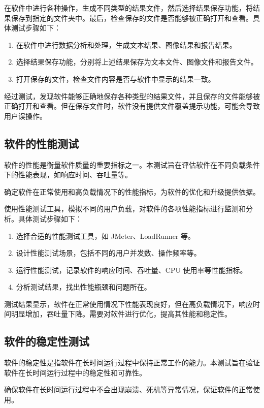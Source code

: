 在软件中进行各种操作，生成不同类型的结果文件，然后选择结果保存功能，将结果保存到指定的文件夹中。最后，检查保存的文件是否能够被正确打开和查看。具体测试步骤如下：
\begin{enumerate}
    \item 在软件中进行数据分析和处理，生成文本结果、图像结果和报告结果。
    \item 选择结果保存功能，分别将上述结果保存为文本文件、图像文件和报告文件。
    \item 打开保存的文件，检查文件内容是否与软件中显示的结果一致。
\end{enumerate}

经过测试，发现软件能够正确地保存各种类型的结果文件，并且保存的文件能够被正确打开和查看。但在保存文件时，软件没有提供文件覆盖提示功能，可能会导致用户误操作。

\subsection{软件的性能测试}
软件的性能是衡量软件质量的重要指标之一。本测试旨在评估软件在不同负载条件下的性能表现，如响应时间、吞吐量等。

确定软件在正常使用和高负载情况下的性能指标，为软件的优化和升级提供依据。

使用性能测试工具，模拟不同的用户负载，对软件的各项性能指标进行监测和分析。具体测试步骤如下：
\begin{enumerate}
    \item 选择合适的性能测试工具，如 JMeter、LoadRunner 等。
    \item 设计性能测试场景，包括不同的用户并发数、操作频率等。
    \item 运行性能测试，记录软件的响应时间、吞吐量、CPU 使用率等性能指标。
    \item 分析测试结果，找出性能瓶颈和问题所在。
\end{enumerate}

测试结果显示，软件在正常使用情况下性能表现良好，但在高负载情况下，响应时间明显增加，吞吐量下降。需要对软件进行优化，提高其性能和稳定性。

\subsection{软件的稳定性测试}
软件的稳定性是指软件在长时间运行过程中保持正常工作的能力。本测试旨在验证软件在长时间运行过程中的稳定性和可靠性。

确保软件在长时间运行过程中不会出现崩溃、死机等异常情况，保证软件的正常使用。


